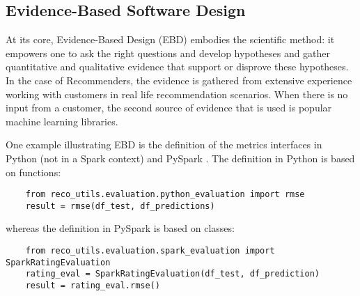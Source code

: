 %

\subsection{Evidence-Based Software Design}
At its core, Evidence-Based Design (EBD) \cite{kembel2012architectural,joeglekar2018evidence} embodies the 
scientific method: it empowers one to ask the right questions and develop hypotheses 
and gather quantitative and qualitative evidence that support or disprove these hypotheses. 
In the case of Recommenders, the evidence is gathered from extensive experience working 
with customers in real life recommendation scenarios. When there is no input from a 
customer, the second source of evidence that is used is popular machine learning
libraries.

One example illustrating EBD is the definition of the metrics interfaces in Python (not in a Spark context) and 
PySpark \cite{meng2016mllib}. The definition in Python is based on functions:

\begin{verbatim}
    from reco_utils.evaluation.python_evaluation import rmse
    result = rmse(df_test, df_predictions)
\end{verbatim}

whereas the definition in PySpark is based on classes:
\begin{verbatim}
    from reco_utils.evaluation.spark_evaluation import SparkRatingEvaluation
    rating_eval = SparkRatingEvaluation(df_test, df_prediction)
    result = rating_eval.rmse()
\end{verbatim}

